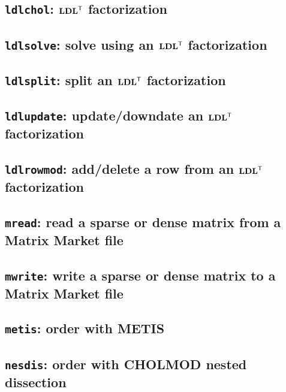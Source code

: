 \documentclass[11pt]{article}
\newcommand{\m}[1]{{\bf{#1}}}       %
\newcommand{\tr}{^{\sf T}}          %
\begin{document}
\subsection{{\tt ldlchol}: $\m{LDL}\tr$ factorization}


\subsection{{\tt ldlsolve}: solve using an $\m{LDL}\tr$ factorization}


\subsection{{\tt ldlsplit}: split an $\m{LDL}\tr$ factorization}


\subsection{{\tt ldlupdate}: update/downdate an $\m{LDL}\tr$ factorization}


\subsection{{\tt ldlrowmod}: add/delete a row from an $\m{LDL}\tr$
factorization}


\subsection{{\tt mread}: read a sparse or dense matrix from a Matrix Market
file}


\subsection{{\tt mwrite}: write a sparse or dense matrix to a Matrix Market
file}


\subsection{{\tt metis}: order with METIS}


\subsection{{\tt nesdis}: order with CHOLMOD nested dissection}

\end{document}
